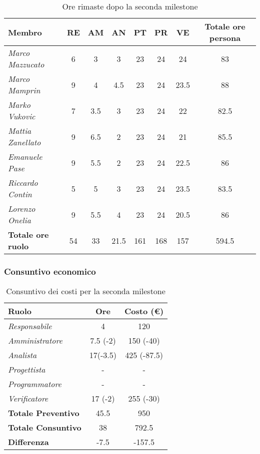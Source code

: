 \begin{table}[H]
    \centering
    \begin{tabular}{|l|c|c|c|c|c|c|c|}
    \hline
    \textbf{Membro} & \textbf{RE} & \textbf{AM} & \textbf{AN} & \textbf{PT} & \textbf{PR} & \textbf{VE} & \textbf{Totale ore persona} \\ \hline
    \textit{Marco Mazzucato}  & 6  & 3    & 3    & 23  & 24 & 24     & 83     \\ \hline
    \textit{Marco Mamprin}    & 9  & 4    & 4.5  & 23  & 24 & 23.5   & 88     \\ \hline
    \textit{Marko Vukovic}    & 7  & 3.5  & 3    & 23  & 24 & 22     & 82.5   \\ \hline
    \textit{Mattia Zanellato} & 9  & 6.5  & 2    & 23  & 24 & 21     & 85.5   \\ \hline
    \textit{Emanuele Pase}    & 9  & 5.5  & 2    & 23  & 24 & 22.5   & 86     \\ \hline
    \textit{Riccardo Contin}  & 5  & 5    & 3    & 23  & 24 & 23.5   & 83.5   \\ \hline
    \textit{Lorenzo Onelia}   & 9  & 5.5  & 4    & 23  & 24 & 20.5   & 86     \\ \hline
    \textbf{Totale ore ruolo} & 54 & 33   & 21.5 & 161 & 168& 157    & 594.5  \\ \hline
    \end{tabular}
    \caption{Ore rimaste dopo la seconda milestone}
\end{table}

\subsubsection{Consuntivo economico}

\begin{table}[H]
    \centering
    \begin{tabular}{|l|c|c|}
    \hline
    \textbf{Ruolo} & \textbf{Ore} & \textbf{Costo (€)} \\ \hline
    \textit{Responsabile}      & 4         & 120         \\ \hline
    \textit{Amministratore}    & 7.5 (-2)  & 150 (-40)   \\ \hline
    \textit{Analista}          & 17(-3.5)  & 425 (-87.5) \\ \hline
    \textit{Progettista}       & -         & -           \\ \hline
    \textit{Programmatore}     & -         & -           \\ \hline
    \textit{Verificatore}      & 17 (-2)   & 255 (-30)   \\ \hline
    \textbf{Totale Preventivo} & 45.5      & 950         \\ \hline
    \textbf{Totale Consuntivo} & 38        & 792.5       \\ \hline
    \textbf{Differenza}        & -7.5      & -157.5      \\ \hline
    \end{tabular}
    \caption{Consuntivo dei costi per la seconda milestone}
\end{table}

